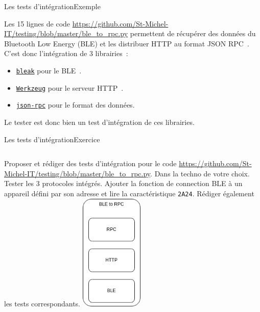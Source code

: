 \documentclass{beamer}
\begin{document}
    \begin{frame}{Les tests d'intégration}{Exemple}

        Les 15 lignes de code \url{https://github.com/St-Michel-IT/testing/blob/master/ble_to_rpc.py} permettent de récupérer des données du Bluetooth Low Energy (BLE) et les distribuer  HTTP au format JSON RPC~.
        \bigbreak
        C'est donc l'intégration de 3 librairies~:
        \begin{itemize}
            \item \href{https://bleak.readthedocs.io/en/latest/index.html}{\lstinline{bleak}} pour le BLE~.
            \item \href{https://werkzeug.palletsprojects.com/en/3.0.x/}{\lstinline{Werkzeug}} pour le serveur HTTP~.
            \item \href{https://github.com/pavlov99/json-rpc}{\lstinline{json-rpc}} pour le format des données.
        \end{itemize}
        \bigbreak
        Le tester est donc bien un test d'intégration de ces librairies.
    \end{frame}

    \begin{frame}{Les tests d'intégration}{Exercice \execcounterdispinc{}}
        \begin{columns}
            Proposer et rédiger des tests d'intégration pour le code \url{https://github.com/St-Michel-IT/testing/blob/master/ble_to_rpc.py}.
            Dans la techno de votre choix.
            \bigbreak
            Tester les 3 protocoles intégrés.
            \bigbreak
            Ajouter la fonction de connection BLE à un appareil défini par son adresse et lire la caractéristique  \lstinline{2A24}.
            Rédiger également les tests correspondants.
            \centering
            \includegraphics[width=3cm]{image/ble-2-rpc-stack.drawio}
        \end{columns}
    \end{frame}
\end{document}
